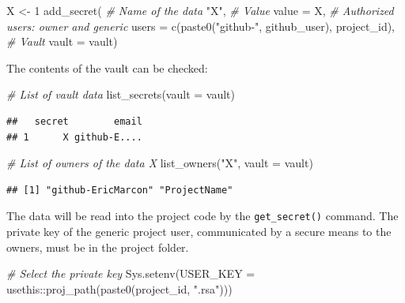 \documentclass[
  12pt,
  american,
  a4paper,
  extrafontsizes,onecolumn,openright
  ]{memoir}
\newenvironment{Shaded}{\begin{snugshade}}{\end{snugshade}}
\newcommand{\AttributeTok}[1]{\textcolor[rgb]{0.77,0.63,0.00}{#1}}
\newcommand{\CommentTok}[1]{\textcolor[rgb]{0.56,0.35,0.01}{\textit{#1}}}
\newcommand{\DecValTok}[1]{\textcolor[rgb]{0.00,0.00,0.81}{#1}}
\newcommand{\FunctionTok}[1]{\textcolor[rgb]{0.00,0.00,0.00}{#1}}
\newcommand{\NormalTok}[1]{#1}
\newcommand{\OtherTok}[1]{\textcolor[rgb]{0.56,0.35,0.01}{#1}}
\newcommand{\SpecialCharTok}[1]{\textcolor[rgb]{0.00,0.00,0.00}{#1}}
\newcommand{\StringTok}[1]{\textcolor[rgb]{0.31,0.60,0.02}{#1}}
\begin{document}
\scriptsize

\begin{Shaded}
\begin{Highlighting}[]
\NormalTok{X }\OtherTok{\textless{}{-}} \DecValTok{1}
\FunctionTok{add\_secret}\NormalTok{(}
  \CommentTok{\# Name of the data}
  \StringTok{"X"}\NormalTok{, }
  \CommentTok{\# Value}
  \AttributeTok{value =}\NormalTok{ X, }
  \CommentTok{\# Authorized users: owner and generic}
  \AttributeTok{users =} \FunctionTok{c}\NormalTok{(}\FunctionTok{paste0}\NormalTok{(}\StringTok{"github{-}"}\NormalTok{, github\_user), project\_id), }
  \CommentTok{\# Vault}
  \AttributeTok{vault =}\NormalTok{ vault)}
\end{Highlighting}
\end{Shaded}

\normalsize

The contents of the vault can be checked:

\scriptsize

\begin{Shaded}
\begin{Highlighting}[]
\CommentTok{\# List of vault data}
\FunctionTok{list\_secrets}\NormalTok{(}\AttributeTok{vault =}\NormalTok{ vault)}
\end{Highlighting}
\end{Shaded}

\begin{verbatim}
##   secret        email
## 1      X github-E....
\end{verbatim}

\begin{Shaded}
\begin{Highlighting}[]
\CommentTok{\# List of owners of the data \textquotesingle{}X}
\FunctionTok{list\_owners}\NormalTok{(}\StringTok{"X"}\NormalTok{, }\AttributeTok{vault =}\NormalTok{ vault)}
\end{Highlighting}
\end{Shaded}

\begin{verbatim}
## [1] "github-EricMarcon" "ProjectName"
\end{verbatim}

\normalsize

The data will be read into the project code by the \texttt{get\_secret()} command.
The private key of the generic project user, communicated by a secure means to the owners, must be in the project folder.

\scriptsize

\begin{Shaded}
\begin{Highlighting}[]
\CommentTok{\# Select the private key}
\FunctionTok{Sys.setenv}\NormalTok{(}\AttributeTok{USER\_KEY =}\NormalTok{ usethis}\SpecialCharTok{::}\FunctionTok{proj\_path}\NormalTok{(}\FunctionTok{paste0}\NormalTok{(project\_id, }\StringTok{".rsa"}\NormalTok{)))}
\end{Highlighting}
\end{Shaded}
\end{document}

